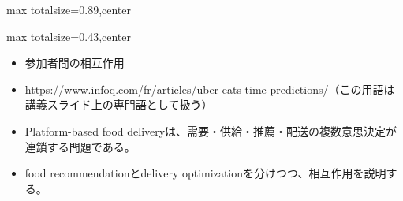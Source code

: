 \begin{minipage}[t]{0.58\textwidth}
\begin{adjustbox}{max totalsize={\textwidth}{0.89\textheight},center}
\begin{minipage}{\textwidth}
\end{minipage}
\end{adjustbox}
\end{minipage}


\clearpage
{}
\begin{minipage}[t]{0.405\textwidth}
\begin{adjustbox}{max totalsize={\textwidth}{0.43\textheight},center}
\begin{minipage}{\textwidth}\scriptsize
{}\begin{itemize}
\item 参加者間の相互作用
\item https://www.infoq.com/fr/articles/uber-eats-time-predictions/（この用語は講義スライド上の専門語として扱う）
\end{itemize}\begin{itemize}
\item Platform-based food deliveryは、需要・供給・推薦・配送の複数意思決定が連鎖する問題である。
\item food recommendationとdelivery optimizationを分けつつ、相互作用を説明する。
\end{itemize}
\end{minipage}
\end{adjustbox}
\end{minipage}\hfill
